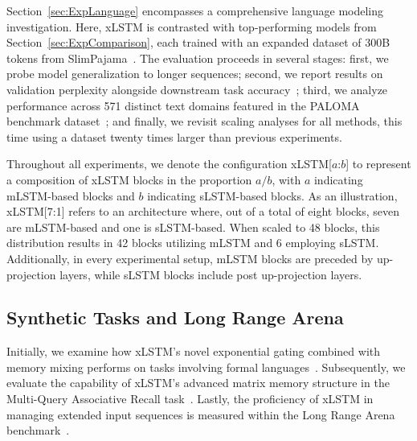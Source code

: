 Section~\ref{sec:ExpLanguage} encompasses a comprehensive language modeling investigation. Here, xLSTM is contrasted with top-performing models from Section~\ref{sec:ExpComparison}, each trained with an expanded dataset of 300B tokens from SlimPajama~\citep{Soboleva:23}. The evaluation proceeds in several stages: first, we probe model generalization to longer sequences; second, we report results on validation perplexity alongside downstream task accuracy~\citep{Sutawika:24}; third, we analyze performance across 571 distinct text domains featured in the PALOMA benchmark dataset~\citep{Magnusson:23arxivshort}; and finally, we revisit scaling analyses for all methods, this time using a dataset twenty times larger than previous experiments.

\label{sec:xlstm_blocks_notation}
Throughout all experiments, we denote the configuration xLSTM[$a$:$b$] to represent a composition of xLSTM blocks in the proportion $a/b$, with $a$ indicating mLSTM-based blocks and $b$ indicating sLSTM-based blocks. As an illustration, xLSTM[7:1] refers to an architecture where, out of a total of eight blocks, seven are mLSTM-based and one is sLSTM-based. When scaled to 48 blocks, this distribution results in 42 blocks utilizing mLSTM and 6 employing sLSTM. Additionally, in every experimental setup, mLSTM blocks are preceded by up-projection layers, while sLSTM blocks include post up-projection layers.

\subsection{Synthetic Tasks and Long Range Arena}
\label{sec:ExpSyntethic}
Initially, we examine how xLSTM’s novel exponential gating combined with memory mixing performs on tasks involving formal languages~\citep{Deletang:23}. Subsequently, we evaluate the capability of xLSTM’s advanced matrix memory structure in the Multi-Query Associative Recall task~\citep{Arora:23arxiv}. Lastly, the proficiency of xLSTM in managing extended input sequences is measured within the Long Range Arena benchmark~\citep{Tay:21}.

